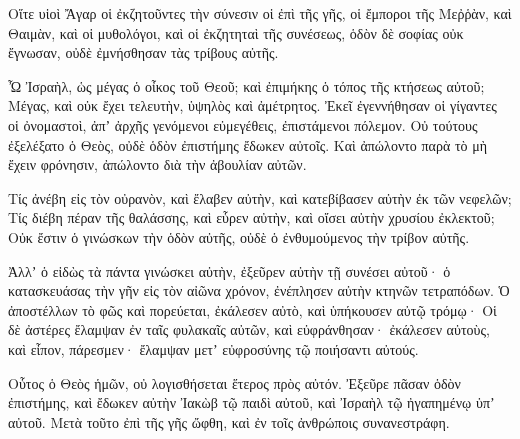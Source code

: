 {\par }{\PP {}Οἵτε υἱοὶ Ἄγαρ οἱ ἐκζητοῦντες τὴν σύνεσιν οἱ ἐπὶ τῆς γῆς, οἱ ἔμποροι τῆς Μεῤῥὰν, καὶ Θαιμὰν, καὶ οἱ μυθολόγοι, καὶ οἱ ἐκζητηταὶ τῆς συνέσεως, ὁδὸν δὲ σοφίας οὐκ ἔγνωσαν, οὐδὲ ἐμνήσθησαν τὰς τρίβους αὐτῆς.
\par }{\PP {}Ὦ Ἰσραὴλ, ὡς μέγας ὁ οἶκος τοῦ Θεοῦ; καὶ ἐπιμήκης ὁ τόπος τῆς κτήσεως αὐτοῦ;
Μέγας, καὶ οὐκ ἔχει τελευτὴν, ὑψηλὸς καὶ ἀμέτρητος.
Ἐκεῖ ἐγεννήθησαν οἱ γίγαντες οἱ ὀνομαστοὶ, ἀπʼ ἀρχῆς γενόμενοι εὐμεγέθεις, ἐπιστάμενοι πόλεμον.
Οὐ τούτους ἐξελέξατο ὁ Θεὸς, οὐδὲ ὁδὸν ἐπιστήμης ἔδωκεν αὐτοῖς.
Καὶ ἀπώλοντο παρὰ τὸ μὴ ἔχειν φρόνησιν, ἀπώλοντο διὰ τὴν ἀβουλίαν αὐτῶν.
\par }{\PP {}Τίς ἀνέβη εἰς τὸν οὐρανὸν, καὶ ἔλαβεν αὐτὴν, καὶ κατεβίβασεν αὐτὴν ἐκ τῶν νεφελῶν;
Τίς διέβη πέραν τῆς θαλάσσης, καὶ εὗρεν αὐτὴν, καὶ οἴσει αὐτὴν χρυσίου ἐκλεκτοῦ;
Οὐκ ἔστιν ὁ γινώσκων τὴν ὁδὸν αὐτῆς, οὐδὲ ὁ ἐνθυμούμενος τὴν τρίβον αὐτῆς.
\par }{\PP {}Ἀλλʼ ὁ εἰδὼς τὰ πάντα γινώσκει αὐτὴν, ἐξεῦρεν αὐτὴν τῇ συνέσει αὐτοῦ· ὁ κατασκευάσας τὴν γῆν εἰς τὸν αἰῶνα χρόνον, ἐνέπλησεν αὐτὴν κτηνῶν τετραπόδων.
Ὁ ἀποστέλλων τὸ φῶς καὶ πορεύεται, ἐκάλεσεν αὐτὸ, καὶ ὑπήκουσεν αὐτῷ τρόμῳ·
Οἱ δὲ ἀστέρες ἔλαμψαν ἐν ταῖς φυλακαῖς αὐτῶν, καὶ εὐφράνθησαν· ἐκάλεσεν αὐτοὺς, καὶ εἶπον, πάρεσμεν· ἔλαμψαν μετʼ εὐφροσύνης τῷ ποιήσαντι αὐτούς.
\par }{\PP {}Οὗτος ὁ Θεὸς ἡμῶν, οὐ λογισθήσεται ἕτερος πρὸς αὐτόν.
Ἐξεῦρε πᾶσαν ὁδὸν ἐπιστήμης, καὶ ἔδωκεν αὐτὴν Ἰακὼβ τῷ παιδὶ αὐτοῦ, καὶ Ἰσραὴλ τῷ ἠγαπημένῳ ὑπʼ αὐτοῦ.
Μετὰ τοῦτο ἐπὶ τῆς γῆς ὤφθη, καὶ ἐν τοῖς ἀνθρώποις συνανεστράφη.

}
